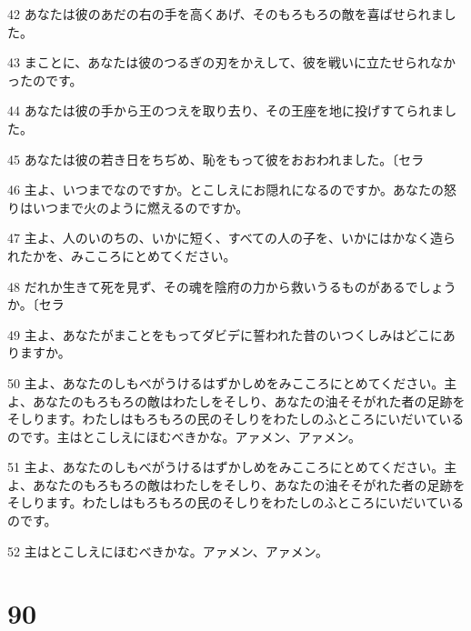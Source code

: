 \par 42 あなたは彼のあだの右の手を高くあげ、そのもろもろの敵を喜ばせられました。
\par 43 まことに、あなたは彼のつるぎの刃をかえして、彼を戦いに立たせられなかったのです。
\par 44 あなたは彼の手から王のつえを取り去り、その王座を地に投げすてられました。
\par 45 あなたは彼の若き日をちぢめ、恥をもって彼をおおわれました。〔セラ
\par 46 主よ、いつまでなのですか。とこしえにお隠れになるのですか。あなたの怒りはいつまで火のように燃えるのですか。
\par 47 主よ、人のいのちの、いかに短く、すべての人の子を、いかにはかなく造られたかを、みこころにとめてください。
\par 48 だれか生きて死を見ず、その魂を陰府の力から救いうるものがあるでしょうか。〔セラ
\par 49 主よ、あなたがまことをもってダビデに誓われた昔のいつくしみはどこにありますか。
\par 50 主よ、あなたのしもべがうけるはずかしめをみこころにとめてください。主よ、あなたのもろもろの敵はわたしをそしり、あなたの油そそがれた者の足跡をそしります。わたしはもろもろの民のそしりをわたしのふところにいだいているのです。主はとこしえにほむべきかな。アァメン、アァメン。
\par 51 主よ、あなたのしもべがうけるはずかしめをみこころにとめてください。主よ、あなたのもろもろの敵はわたしをそしり、あなたの油そそがれた者の足跡をそしります。わたしはもろもろの民のそしりをわたしのふところにいだいているのです。
\par 52 主はとこしえにほむべきかな。アァメン、アァメン。

\chapter{90}

